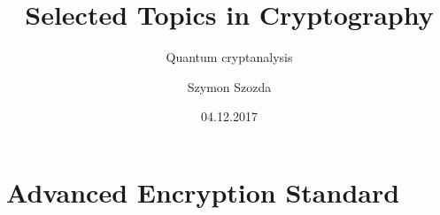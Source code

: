 \documentclass[compress]{beamer} %
\title{Selected Topics in Cryptography}
\subtitle{Quantum cryptanalysis}
\author[]{Szymon Szozda}
\institute[KT AGH]{Department of Telecommunications}
\date{04.12.2017}
\begin{document}
	\begin{frame}
    	\titlepage
	\end{frame}


\renewcommand{\logosinfootline}{\raisebox{0.12cm}{\begin{beamercolorbox}{rafi}{Selected Topics in Cryptography \quad \insertframenumber/\inserttotalframenumber}\end{beamercolorbox}}}
\section{Advanced Encryption Standard} 


%
%

%

%

\end{document}
